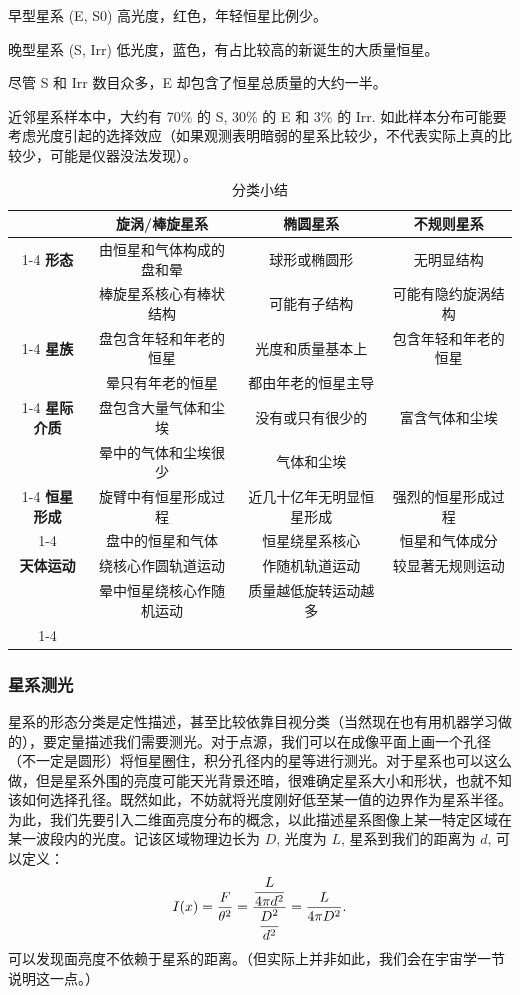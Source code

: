 \documentclass[../天体物理基础.tex]{subfiles}
\begin{document}
早型星系 (E, S0) 高光度，红色，年轻恒星比例少。

晚型星系 (S, Irr) 低光度，蓝色，有占比较高的新诞生的大质量恒星。

尽管 S 和 Irr 数目众多，E 却包含了恒星总质量的大约一半。

近邻星系样本中，大约有 70\% 的 S, 30\% 的 E 和 3\% 的 Irr. 如此样本分布可能要考虑光度引起的选择效应（如果观测表明暗弱的星系比较少，不代表实际上真的比较少，可能是仪器没法发现）。

\begin{table}[htbp]
\centering
\caption{分类小结}
\begin{tabular}{c c c c}
\hline
 & 旋涡/棒旋星系 & 椭圆星系 & 不规则星系\\
\cline{1-4}
\textbf{形态} & 由恒星和气体构成的盘和晕 & 球形或椭圆形 & 无明显结构\\
 & 棒旋星系核心有棒状结构 & 可能有子结构 & 可能有隐约旋涡结构\\
\cline{1-4}
\textbf{星族} & 盘包含年轻和年老的恒星 & 光度和质量基本上 & 包含年轻和年老的恒星\\
 & 晕只有年老的恒星 & 都由年老的恒星主导 & \\
\cline{1-4}
\textbf{星际介质} & 盘包含大量气体和尘埃 & 没有或只有很少的 & 富含气体和尘埃\\
 & 晕中的气体和尘埃很少 & 气体和尘埃 & \\
\cline{1-4}
\textbf{恒星形成} & 旋臂中有恒星形成过程 & 近几十亿年无明显恒星形成 & 强烈的恒星形成过程\\
\cline{1-4}
 & 盘中的恒星和气体 & 恒星绕星系核心 & 恒星和气体成分\\
\textbf{天体运动} & 绕核心作圆轨道运动 & 作随机轨道运动 & 较显著无规则运动\\
 & 晕中恒星绕核心作随机运动 & 质量越低旋转运动越多 & \\
\cline{1-4}
\end{tabular}
\label{2}
\end{table}

\subsubsection{星系测光}
星系的形态分类是定性描述，甚至比较依靠目视分类（当然现在也有用机器学习做的），要定量描述我们需要测光。对于点源，我们可以在成像平面上画一个孔径（不一定是圆形）将恒星圈住，积分孔径内的星等进行测光。对于星系也可以这么做，但是星系外围的亮度可能天光背景还暗，很难确定星系大小和形状，也就不知该如何选择孔径。既然如此，不妨就将光度刚好低至某一值的边界作为星系半径。为此，我们先要引入二维面亮度分布的概念，以此描述星系图像上某一特定区域在某一波段内的光度。记该区域物理边长为 $D$, 光度为 $L$, 星系到我们的距离为 $d$, 可以定义：
\begin{equation}
I\mleft(x\mright)=\frac{F}{\theta^{2}}=\dfrac{\dfrac{L}{4\pi{}d^{2}}}{\dfrac{D^{2}}{d^{2}}}=\frac{L}{4\pi{}D^{2}}.\label{1.5.2}
\end{equation}
可以发现面亮度不依赖于星系的距离。（但实际上并非如此，我们会在宇宙学一节说明这一点。）
\end{document}
